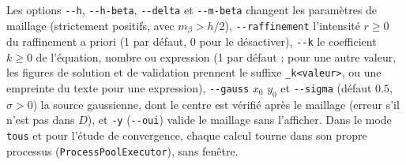\documentclass[11pt,a4paper]{article}
\begin{document}
Les options \texttt{-{}-h}, \texttt{-{}-h-beta}, \texttt{-{}-delta} et
\texttt{-{}-m-beta} changent les paramètres de maillage (strictement positifs,
avec $m_\beta > h/2$), \texttt{-{}-raffinement} l'intensité $r \ge 0$ du
raffinement a priori (1 par défaut, 0 pour le désactiver), \texttt{-{}-k} le
coefficient $k \ge 0$ de l'équation, nombre ou expression (1 par défaut ; pour
une autre valeur, les figures de solution et de validation prennent le suffixe
\texttt{\_k<valeur>}, ou une empreinte du texte pour une expression),
\texttt{-{}-gauss} $x_0$ $y_0$ et \texttt{-{}-sigma}
(défaut $0.5$, $\sigma > 0$) la source gaussienne, dont le centre est
vérifié après le maillage (erreur s'il n'est pas dans $D$), et \texttt{-y}
(\texttt{-{}-oui}) valide le maillage sans l'afficher. Dans le mode
\texttt{tous} et pour l'étude de convergence, chaque calcul tourne dans son
propre processus (\texttt{ProcessPoolExecutor}), sans fenêtre.
\end{document}
